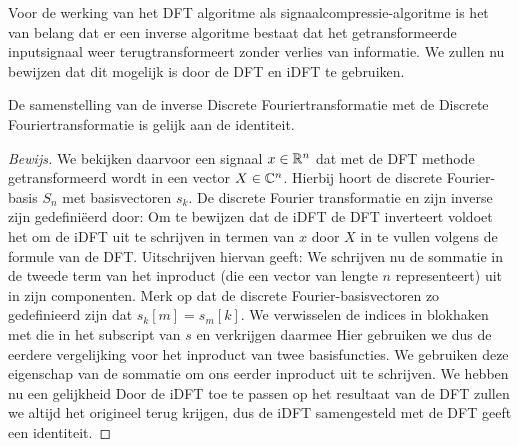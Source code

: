 Voor de werking van het DFT algoritme als signaalcompressie-algoritme is het van belang dat er een 
inverse algoritme bestaat dat het getransformeerde inputsignaal weer terugtransformeert 
zonder verlies van informatie. We zullen nu bewijzen dat dit mogelijk is door de DFT en iDFT te gebruiken.

\begin{stelling}
  De samenstelling van de inverse Discrete Fouriertransformatie met de Discrete Fouriertransformatie is
  gelijk aan de identiteit.
\end{stelling}
\begin{proof}[Bewijs]
We bekijken daarvoor een signaal $x\in\mathbb{R}^n$ dat met de DFT methode getransformeerd wordt in een vector $X\in\mathbb{C}^n$.
Hierbij hoort de discrete Fourier-basis $S_n$ met basisvectoren $s_k$. 
De discrete Fourier transformatie en zijn inverse zijn gedefini\"eerd door:
Om te bewijzen dat de iDFT de DFT inverteert voldoet het om de iDFT uit te schrijven in termen van $x$ 
door $X$ in te vullen volgens de formule van de DFT. Uitschrijven hiervan geeft:
We schrijven nu de sommatie in de tweede term van het inproduct (die een vector van lengte $n$ representeert) uit in zijn componenten. 
Merk op dat de discrete Fourier-basisvectoren zo gedefinieerd zijn dat $s_k[m] = s_m[k]$. 
We verwisselen de indices in blokhaken met die in het subscript van $s$ en verkrijgen daarmee
Hier gebruiken we dus de eerdere vergelijking voor het inproduct van twee basisfuncties.
We gebruiken deze eigenschap van de sommatie om ons eerder inproduct uit te schrijven. 
We hebben nu een gelijkheid
Door de iDFT toe te passen op het resultaat van de DFT zullen we altijd het origineel terug krijgen,
dus de iDFT samengesteld met de DFT geeft een identiteit.
\end{proof}

